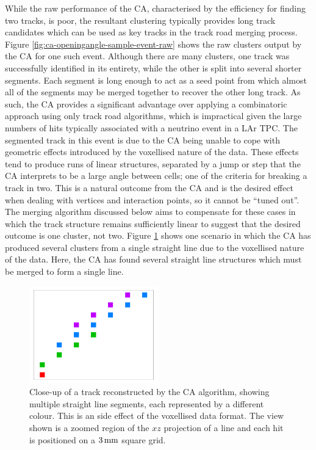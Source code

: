 While the raw performance of the \ac{CA}, characterised by the efficiency for finding two tracks, is poor, the resultant clustering typically provides long track candidates which can be used as key tracks in the track road merging process. Figure \ref{fig:ca-openingangle-sample-event-raw} shows the raw clusters output by the CA for one such event. Although there are many clusters, one track was successfully identified in its entirety, while the other is split into several shorter segments. Each segment is long enough to act as a seed point from which almost all of the segments may be merged together to recover the other long track. As such, the CA provides a significant advantage over applying a combinatoric approach using only track road algorithms, which is impractical given the large numbers of hits typically associated with a neutrino event in a \ac{LAr TPC}. The segmented track in this event is due to the CA being unable to cope with geometric effects introduced by the voxellised nature of the data. These effects tend to produce runs of linear structures, separated by a jump or step that the CA interprets to be a large angle between cells; one of the criteria for breaking a track in two. This is a natural outcome from the CA and is the desired effect when dealing with vertices and interaction points, so it cannot be ``tuned out''. The merging algorithm discussed below aims to compensate for these cases in which the track structure remains sufficiently linear to suggest that the desired outcome is one cluster, not two. Figure \ref{fig:ca-clustering-anomalies} shows one scenario in which the CA has produced several clusters from a single straight line due to the voxellised nature of the data. Here, the CA has found several straight line structures which must be merged to form a single line.

\begin{figure}
    \centering
    \includegraphics[width=0.5\textwidth]{chapters/cellularautomaton_images/clusters}
    \caption[Multiple reconstructed clusters for a single straight line]{\label{fig:ca-clustering-anomalies}Close-up of a track reconstructed by the CA algorithm, showing multiple straight line segments, each represented by a different colour. This is an side effect of the voxellised data format. The view shown is a zoomed region of the $xz$ projection of a line and each hit is positioned on a $3\,\mathrm{mm}$ square grid.}
\end{figure}

